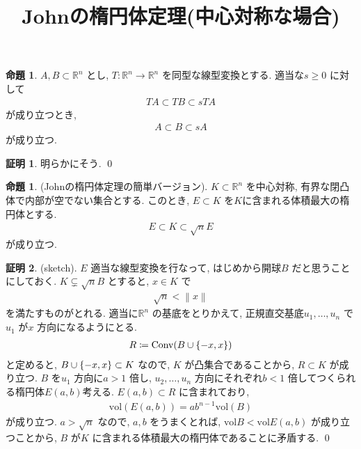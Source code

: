 \documentclass[10pt, fleqn, label-section=none]{bxjsarticle}
\title{Johnの楕円体定理(中心対称な場合)   }
\date{}
\author{}
\theoremstyle{definition}
\newtheorem{prop}[dfn]{命題}
\newtheorem*{pf*}{証明}
\newcommand{\paren}[1]{\mleft( #1\mright )}
\newcommand{\cbra}[1]{\mleft\{#1\mright\}}
\newcommand{\norm}[1]{\left\|#1\right\|}
\newcommand{\vol}{\textrm{vol}}
\renewcommand{\;}{\, ; \,}
\newcommand{\Conv}{\textrm{Conv}}
\begin{document}
\maketitle

\section{}




\begin{prop}$A , B \subset \mathbb R^n$ とし, $T: \mathbb R^n \rightarrow \mathbb R^n$ を同型な線型変換とする.  適当な$s \geq 0$ に対して
\begin{align*} TA \subset TB \subset sTA \end{align*}
が成り立つとき, 
\begin{align*} A \subset B \subset sA \end{align*}
が成り立つ. 
\end{prop}
\begin{pf*}
明らかにそう. 
\qed
\end{pf*}

\begin{prop}(Johnの楕円体定理の簡単バージョン). $K \subset \mathbb R^n$ を中心対称, 有界な閉凸体で内部が空でない集合とする. このとき, $E \subset K$ を$K$に含まれる体積最大の楕円体とする.  
\begin{align*} E \subset K \subset \sqrt n E\end{align*}
が成り立つ. 
\end{prop}
\begin{pf*}(sketch). 
$E $ 適当な線型変換を行なって, はじめから開球$B$ だと思うことにしておく. $K \subsetneq \sqrt n B$ とすると, $ x \in K$ で
\begin{align*} \sqrt n < \norm x \end{align*} 
を満たすものがとれる. 適当に$\mathbb R^n$ の基底をとりかえて, 正規直交基底$u_1, \ldots, u_n$ で$u_1$ が$x$ 方向になるようにとる. 
\begin{align*} R \coloneqq \Conv \paren{   B \cup \cbra{-x , x} } \end{align*} 
と定めると, $ B \cup \cbra{-x , x} \subset K$ なので, $K$ が凸集合であることから, $R \subset K$ が成り立つ. $B$ を$u_1$ 方向に$a > 1$ 倍し, $u_2, \ldots , u_n$ 方向にそれぞれ$b < 1$ 倍してつくられる楕円体$E(a,b)$考える. $E(a,b) \subset R$ に含まれており,  
\begin{align*} \vol(E(a,b)) = a b^{n-1} \vol (B)\end{align*}
が成り立つ. 
$a > \sqrt n$ なので, $a, b$ をうまくとれば, $\vol B < \vol E(a, b)$
が成り立つことから, $B$ が$K$ に含まれる体積最大の楕円体であることに矛盾する. 
\qed
\end{pf*}
\end{document}
